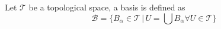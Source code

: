 \documentclass{article}
\begin{document}
Let \( \mathcal{T} \) be a topological space, a basis is defined as
\[
    \mathcal{B} = \{B_{\alpha} \in \mathcal{T}\, |\,  U = \bigcup B_{\alpha} \forall U \in \mathcal{T} \}
\]
\end{document}
